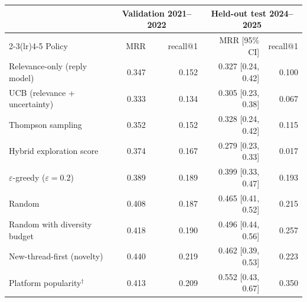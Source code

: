 \begin{tabular}{lrrrr}\toprule
 & \multicolumn{2}{c}{Validation 2021--2022} & \multicolumn{2}{c}{Held-out test 2024--2025}\\
\cmidrule(lr){2-3}\cmidrule(lr){4-5}
Policy & MRR & recall@1 & MRR [95\% CI] & recall@1\\\midrule
Relevance-only (reply model) & 0.347 & 0.152 & 0.327 [0.24, 0.42] & 0.100\\
UCB (relevance + uncertainty) & 0.333 & 0.134 & 0.305 [0.23, 0.38] & 0.067\\
Thompson sampling & 0.352 & 0.152 & 0.328 [0.24, 0.42] & 0.115\\
Hybrid exploration score & 0.374 & 0.167 & 0.279 [0.23, 0.33] & 0.017\\
$\varepsilon$-greedy ($\varepsilon=0.2$) & 0.389 & 0.189 & 0.399 [0.33, 0.47] & 0.193\\
Random & 0.408 & 0.187 & 0.465 [0.41, 0.52] & 0.215\\
Random with diversity budget & 0.418 & 0.190 & 0.496 [0.44, 0.56] & 0.257\\
New-thread-first (novelty) & 0.440 & 0.219 & 0.462 [0.39, 0.53] & 0.223\\
Platform popularity$^\dagger$ & 0.413 & 0.209 & 0.552 [0.43, 0.67] & 0.350\\
\bottomrule
\end{tabular}
